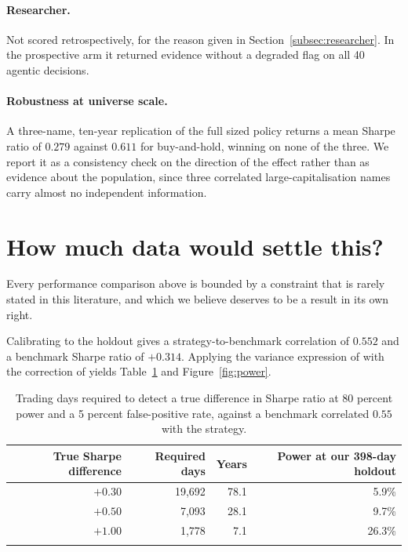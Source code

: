 \documentclass[pdflatex,sn-apa]{sn-jnl}%
\theoremstyle{thmstyleone}%
\theoremstyle{thmstyletwo}%
\theoremstyle{thmstylethree}%
\begin{document}
\paragraph{Researcher.} Not scored retrospectively, for the reason given in
Section~\ref{subsec:researcher}. In the prospective arm it returned evidence
without a degraded flag on all 40 agentic decisions.

\paragraph{Robustness at universe scale.} A three-name, ten-year replication of
the full sized policy returns a mean Sharpe ratio of $0.279$ against $0.611$
for buy-and-hold, winning on none of the three. We report it as a consistency
check on the direction of the effect rather than as evidence about the
population, since three correlated large-capitalisation names carry almost no
independent information.

\section{How much data would settle this?}\label{sec:power}

Every performance comparison above is bounded by a constraint that is rarely
stated in this literature, and which we believe deserves to be a result in its
own right.

Calibrating to the holdout gives a strategy-to-benchmark correlation of $0.552$
and a benchmark Sharpe ratio of $+0.314$. Applying the variance expression of
\citet{jobson1981performance} with the correction of
\citet{memmel2003performance} yields Table~\ref{tab:power} and
Figure~\ref{fig:power}.

\begin{table}[h]
\caption{Trading days required to detect a true difference in Sharpe ratio at
80 percent power and a 5 percent false-positive rate, against a benchmark
correlated $0.55$ with the strategy.}\label{tab:power}%
\begin{tabular*}{\textwidth}{@{\extracolsep\fill}rrrr@{}}
\toprule
True Sharpe difference & Required days & Years & Power at our 398-day holdout \\
\midrule
$+0.30$ & 19{,}692 & 78.1 & 5.9\% \\
$+0.50$ &  7{,}093 & 28.1 & 9.7\% \\
$+1.00$ &  1{,}778 &  7.1 & 26.3\% \\
\botrule
\end{tabular*}
\end{table}
\end{document}
